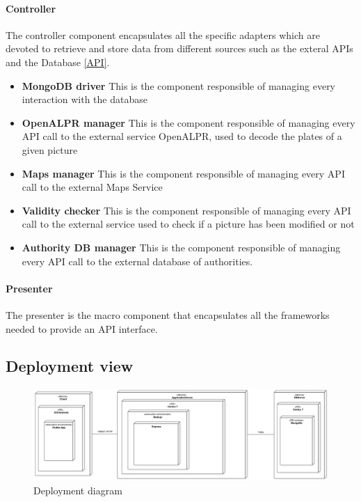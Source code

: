 \paragraph{Controller}
The controller component encapsulates all the specific adapters which are devoted to retrieve and store data from different sources such as the exteral APIs and the Database \ref{API}.
\begin{itemize}
  \item \textbf{MongoDB driver} This is the component responsible of managing every interaction with the database
  \item \textbf{OpenALPR manager} This is the component responsible of managing every API call to the external service OpenALPR, used to decode the plates of a given picture
  \item \textbf{Maps manager} This is the component responsible of managing every API call to the external Maps Service
  \item \textbf{Validity checker} This is the component responsible of managing every API call to the external service used to check if a picture has been modified or not
  \item \textbf{Authority DB manager} This is the component responsible of managing every API call to the external database of authorities.
\end{itemize}


\paragraph{Presenter}
The presenter is the macro component that encapsulates all the frameworks needed to provide an API interface.


\subsection{Deployment view}
\begin{figure}[H]
\centering
\includegraphics[width=\textwidth]{Images/DeploymentDiagram1.png}
\caption{\label{fig:deploy} Deployment diagram}
\end{figure}

